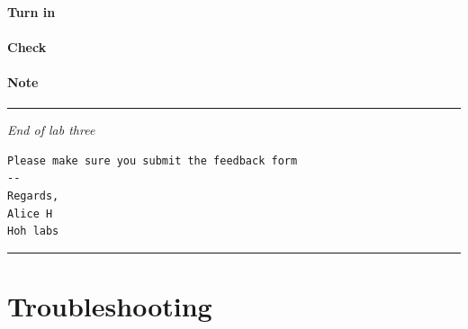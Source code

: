 \documentclass[]{book}
\begin{document}
\subsubsection*{Turn in}\label{turn-in-20}

\subsubsection*{Check}\label{check-20}

\subsubsection*{Note}\label{note-22}

\begin{center}\rule{0.5\linewidth}{\linethickness}\end{center}

\emph{End of lab three}

\begin{verbatim}
Please make sure you submit the feedback form
--
Regards,
Alice H
Hoh labs
\end{verbatim}

\begin{center}\rule{0.5\linewidth}{\linethickness}\end{center}

\chapter*{Troubleshooting}\label{troubleshooting}
\end{document}
